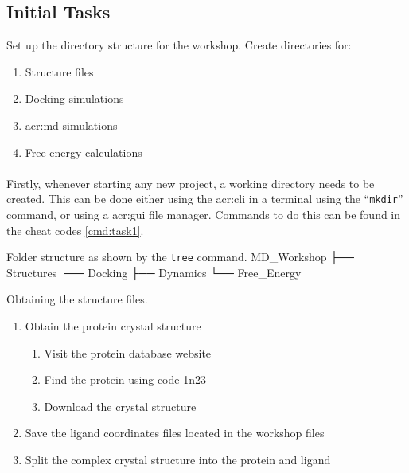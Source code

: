 \subsection{Initial Tasks}
    \begin{task}[label=task:setup]{Set up the directory structure for the workshop.}
    Create directories for:
        \begin{enumerate}[label=(\alph*)]
            \item Structure files
            \item Docking simulations
            \item \gls{acr:md} simulations
            \item Free energy calculations
        \end{enumerate}
    \end{task}

    \paragraph{}
    Firstly, whenever starting any new project, a working directory needs to be created. This can be done either using the \gls{acr:cli} in a terminal using the \enquote{\texttt{mkdir}} command, or using a \gls{acr:gui} file manager. Commands to do this can be found in the cheat codes \cref{cmd:task1}.

\begin{bashoutput}[label=listing:folders]{Folder structure as shown by the \texttt{tree} command.}
    MD_Workshop
    ├── Structures
    ├── Docking
    ├── Dynamics
    └── Free_Energy
\end{bashoutput}
    
    \begin{task}[label=task:Structures]{Obtaining the structure files.}
    \begin{enumerate}[label=(\alph*)]
        \item Obtain the protein crystal structure
        \begin{enumerate}[label=(\roman*)]
            \item Visit the protein database website
            \item Find the protein using code 1n23
            \item Download the crystal structure
        \end{enumerate}
        \item Save the ligand coordinates files located in the workshop files
        \item Split the complex crystal structure into the protein and ligand
    \end{enumerate}
  \end{task}

